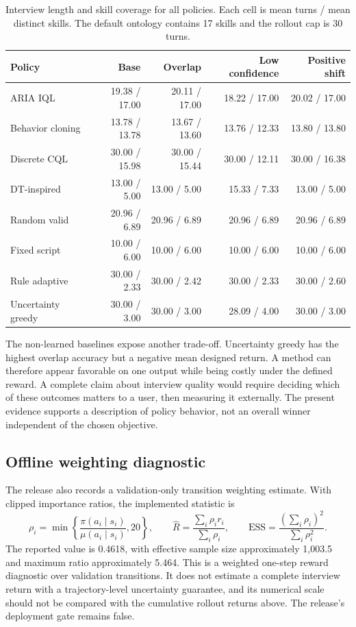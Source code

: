 \documentclass[10pt,a4paper]{article}
\begin{document}
\begin{table}[htbp]
\centering\small
\caption{Interview length and skill coverage for all policies. Each cell is mean turns / mean distinct skills. The default ontology contains 17 skills and the rollout cap is 30 turns.}
\label{tab:efficiency}
\begin{tabularx}{\linewidth}{Xrrrr}
\toprule
Policy & Base & Overlap & Low confidence & Positive shift \\ \midrule
ARIA IQL & 19.38 / 17.00 & 20.11 / 17.00 & 18.22 / 17.00 & 20.02 / 17.00 \\
Behavior cloning & 13.78 / 13.78 & 13.67 / 13.60 & 13.76 / 12.33 & 13.80 / 13.80 \\
Discrete CQL & 30.00 / 15.98 & 30.00 / 15.44 & 30.00 / 12.11 & 30.00 / 16.38 \\
DT-inspired & 13.00 / 5.00 & 13.00 / 5.00 & 15.33 / 7.33 & 13.00 / 5.00 \\
Random valid & 20.96 / 6.89 & 20.96 / 6.89 & 20.96 / 6.89 & 20.96 / 6.89 \\
Fixed script & 10.00 / 6.00 & 10.00 / 6.00 & 10.00 / 6.00 & 10.00 / 6.00 \\
Rule adaptive & 30.00 / 2.33 & 30.00 / 2.42 & 30.00 / 2.33 & 30.00 / 2.60 \\
Uncertainty greedy & 30.00 / 3.00 & 30.00 / 3.00 & 28.09 / 4.00 & 30.00 / 3.00 \\
\bottomrule
\end{tabularx}
\end{table}

The non-learned baselines expose another trade-off. Uncertainty greedy has the highest overlap accuracy but a negative mean designed return. A method can therefore appear favorable on one output while being costly under the defined reward. A complete claim about interview quality would require deciding which of these outcomes matters to a user, then measuring it externally. The present evidence supports a description of policy behavior, not an overall winner independent of the chosen objective.

\subsection{Offline weighting diagnostic}
The release also records a validation-only transition weighting estimate. With clipped importance ratios, the implemented statistic is
\begin{equation}
\rho_i=\min\left\{\frac{\pi(a_i\mid s_i)}{\mu(a_i\mid s_i)},20\right\},\qquad
\widehat R=\frac{\sum_i\rho_i r_i}{\sum_i\rho_i},\qquad
\mathrm{ESS}=\frac{(\sum_i\rho_i)^2}{\sum_i\rho_i^2}.
\end{equation}
The reported value is 0.4618, with effective sample size approximately 1,003.5 and maximum ratio approximately 5.464. This is a weighted one-step reward diagnostic over validation transitions. It does not estimate a complete interview return with a trajectory-level uncertainty guarantee, and its numerical scale should not be compared with the cumulative rollout returns above. The release's deployment gate remains false.
\end{document}
